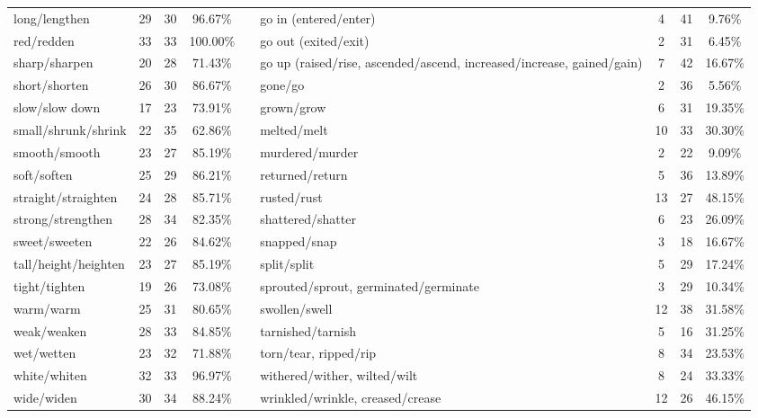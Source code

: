 \begin{tabular}{p{3cm}ccccp{3cm}ccc}
long/lengthen & 29 & 30 & 96.67\% & & go in (entered/enter) & 4 & 41 & 9.76\% \\
red/redden & 33 & 33 & 100.00\% & & go out (exited/exit) & 2 & 31 & 6.45\% \\
sharp/sharpen & 20 & 28 & 71.43\% & & go up (raised/rise, ascended/ascend, increased/increase, gained/gain) & 7 & 42 & 16.67\% \\
short/shorten & 26 & 30 & 86.67\% & & gone/go & 2 & 36 & 5.56\% \\
slow/slow down & 17 & 23 & 73.91\% & & grown/grow & 6 & 31 & 19.35\% \\
small/shrunk/shrink & 22 & 35 & 62.86\% & & melted/melt & 10 & 33 & 30.30\% \\
smooth/smooth & 23 & 27 & 85.19\% & & murdered/murder & 2 & 22 & 9.09\% \\
soft/soften & 25 & 29 & 86.21\% & & returned/return & 5 & 36 & 13.89\% \\
straight/straighten & 24 & 28 & 85.71\% & & rusted/rust & 13 & 27 & 48.15\% \\
strong/strengthen & 28 & 34 & 82.35\% & & shattered/shatter & 6 & 23 & 26.09\% \\
sweet/sweeten & 22 & 26 & 84.62\% & & snapped/snap & 3 & 18 & 16.67\% \\
tall/height/heighten & 23 & 27 & 85.19\% & & split/split & 5 & 29 & 17.24\% \\
tight/tighten & 19 & 26 & 73.08\% & & sprouted/sprout, germinated/germinate & 3 & 29 & 10.34\% \\
warm/warm & 25 & 31 & 80.65\% & & swollen/swell & 12 & 38 & 31.58\% \\
weak/weaken & 28 & 33 & 84.85\% & & tarnished/tarnish & 5 & 16 & 31.25\% \\
wet/wetten & 23 & 32 & 71.88\% & & torn/tear, ripped/rip & 8 & 34 & 23.53\% \\
white/whiten & 32 & 33 & 96.97\% & & withered/wither, wilted/wilt & 8 & 24 & 33.33\% \\
wide/widen & 30 & 34 & 88.24\% & & wrinkled/wrinkle, creased/crease & 12 & 26 & 46.15\%
\end{tabular}